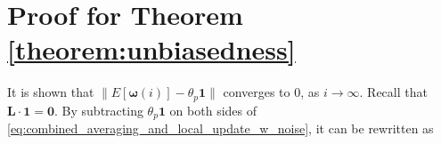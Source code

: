 \documentclass[journal]{IEEEtran}
\begin{document}
%
%
%
%

\section{Proof for Theorem \ref{theorem:unbiasedness}} \label{sec:append_proof_theorem:unbiasedness}
It is shown that $\|E[\bm{\omega}(i)] - \theta_p \mathbf{1}\|$ converges to 0, as $i \to \infty$. Recall that $\mathbf{L} \cdot \mathbf{1} = \mathbf{0}$. By subtracting $\theta_p \mathbf{1}$ on both sides of \eqref{eq:combined_averaging_and_local_update_w_noise}, it can be rewritten as
\end{document}
